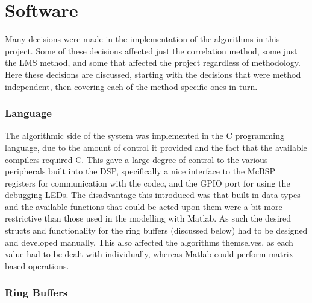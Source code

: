 \section{Software}
Many decisions were made in the implementation of the algorithms in this project.
Some of these decisions affected just the correlation method, some just the LMS method, and some that affected the project regardless of methodology.
Here these decisions are discussed, starting with the decisions that were method independent, then covering each of the method specific ones in turn.

\subsubsection{Language}

The algorithmic side of the system was implemented in the C programming language, due to the amount of control it provided and the fact that the available compilers required C.
This gave a large degree of control to the various peripherals built into the DSP, specifically a nice interface to the McBSP registers for communication with the codec, and the GPIO port for using the debugging LEDs.
The disadvantage this introduced was that built in data types and the available functions that could be acted upon them were a bit more restrictive than those used in the modelling with Matlab.
As such the desired structs and functionality for the ring buffers (discussed below) had to be designed and developed manually.
This also affected the algorithms themselves, as each value had to be dealt with individually, whereas Matlab could perform matrix based operations.

\subsubsection{Ring Buffers}

